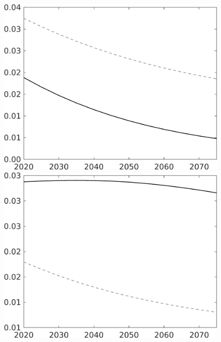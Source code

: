 \documentclass[12pt]{article}
\begin{document}
\begin{figure}
\begin{minipage}[]{0.32\textwidth}
\end{minipage}
\begin{minipage}[]{0.32\textwidth}
\includegraphics[width=1\textwidth]{../../codding_model/own_basedOnFried/optimalPol_010922_revision/figures/all_13Sept22/LevTaufNoTauf_TaulCalib_Equlab_regime0_wsf_spillover0_nsk1_xgr0_knspil1_sep1_LFlimit0_emsbase0_countec0_GovRev0_etaa0.79_lgd0.png}
\end{minipage}
\begin{minipage}[]{0.32\textwidth}
\includegraphics[width=1\textwidth]{../../codding_model/own_basedOnFried/optimalPol_010922_revision/figures/all_13Sept22/LevTaufNoTauf_TaulCalib_Equlab_regime0_wsg_spillover0_nsk1_xgr0_knspil1_sep1_LFlimit0_emsbase0_countec0_GovRev0_etaa0.79_lgd0.png}
\end{minipage}
\end{figure}
\end{document}
